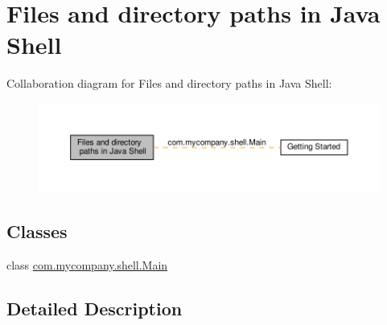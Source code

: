 \hypertarget{group__FileAndDirectoryPaths}{}\section{Files and directory paths in Java Shell}
\label{group__FileAndDirectoryPaths}
Collaboration diagram for Files and directory paths in Java Shell\+:
\nopagebreak
\begin{figure}[H]
\begin{center}
\leavevmode
\includegraphics[width=350pt]{group__FileAndDirectoryPaths}
\end{center}
\end{figure}
\subsection*{Classes}
\begin{DoxyCompactItemize}
\item 
class \hyperlink{classcom_1_1mycompany_1_1shell_1_1Main}{com.\+mycompany.\+shell.\+Main}
\end{DoxyCompactItemize}


\subsection{Detailed Description}
